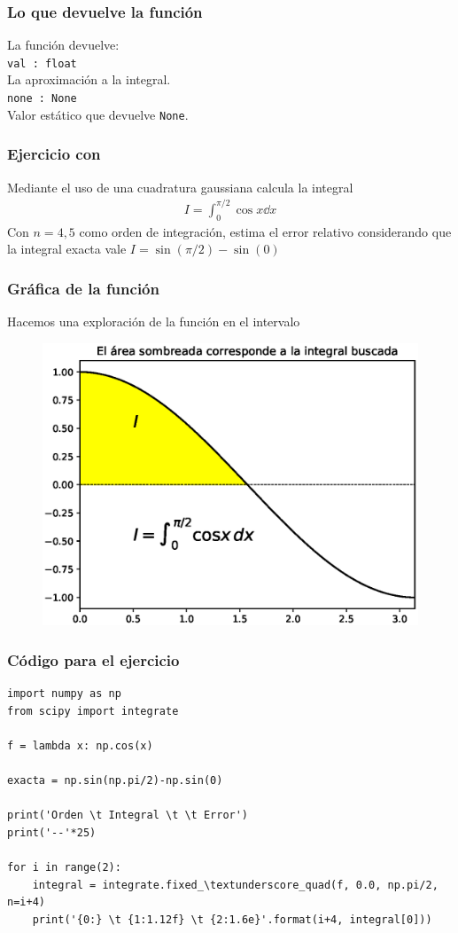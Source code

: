 \begin{frame}[fragile]
\frametitle{Lo que devuelve la función}
La función  devuelve:
\\
\medskip
\verb|val : float|
\\
La aproximación a la integral.
\\
\medskip
\verb|none : None|
\\
Valor estático que devuelve \texttt{None}.
\end{frame}
\begin{frame}
\frametitle{Ejercicio con }
Mediante el uso de una cuadratura gaussiana calcula la integral
\begin{align*}
I = \int_{0}^{\pi/2} \cos x \dd{x}
\end{align*}
Con $n = 4, 5$ como orden de integración, estima el error relativo considerando que la integral exacta vale $I = \sin(\pi/2) - \sin(0)$
\end{frame}
\begin{frame}
\frametitle{Gráfica de la función}
Hacemos una exploración de la función en el intervalo
\begin{figure}[h!]
	\centering
	\includegraphics[scale=0.5]{Imagenes/integracion_modulo_fixed_quad_01.eps}
\end{figure}
\end{frame}
\begin{frame}
\frametitle{Código para el ejercicio}
\begin{lstlisting}[caption=Código para resolver la integral con \texttt{integrate.fixed\_quad}, style=FormattedNumber, basicstyle=\linespread{1.1}\ttfamily=\tiny, columns=fullflexible]
import numpy as np
from scipy import integrate

f = lambda x: np.cos(x)

exacta = np.sin(np.pi/2)-np.sin(0)

print('Orden \t Integral \t \t Error')
print('--'*25)

for i in range(2):
	integral = integrate.fixed_\textunderscore_quad(f, 0.0, np.pi/2, n=i+4)
	print('{0:} \t {1:1.12f} \t {2:1.6e}'.format(i+4, integral[0]))	
\end{lstlisting}
\end{frame}
